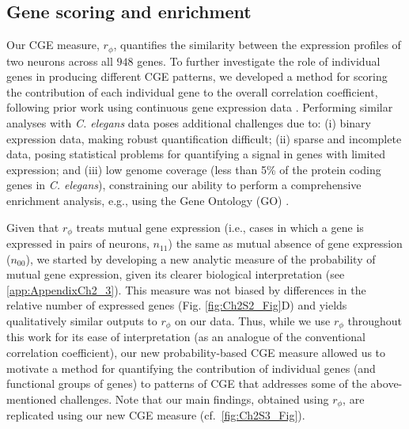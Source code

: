 \subsection*{Gene scoring and enrichment}
Our CGE measure, $r_\phi$, quantifies the similarity between the expression profiles of two neurons across all $948$ genes.
To further investigate the role of individual genes in producing different CGE patterns, we developed a method for scoring the contribution of each individual gene to the overall correlation coefficient, following prior work using continuous gene expression data \citep{Fulcher2016}.
Performing similar analyses with \emph{C. elegans} data poses additional challenges due to:
(i) binary expression data, making robust quantification difficult;
(ii) sparse and incomplete data, posing statistical problems for quantifying a signal in genes with limited expression;
and (iii) low genome coverage (less than 5\% of the protein coding genes in \emph{C. elegans}), constraining our ability to perform a comprehensive enrichment analysis, e.g., using the Gene Ontology (GO) \citep{Ashburner2000}.

Given that $r_\phi$ treats mutual gene expression (i.e., cases in which a gene is expressed in pairs of neurons, $n_{11}$) the same as mutual absence of gene expression ($n_{00}$), we started by developing a new analytic measure of the probability of mutual gene expression, given its clearer biological interpretation (see \ref{app:AppendixCh2_3}).
This measure was not biased by differences in the relative number of expressed genes (Fig. \ref{fig:Ch2S2_Fig}D) and yields qualitatively similar outputs to $r_\phi$ on our data.
Thus, while we use $r_\phi$ throughout this work for its ease of interpretation (as an analogue of the conventional correlation coefficient), our new probability-based CGE measure allowed us to motivate a method for quantifying the contribution of individual genes (and functional groups of genes) to patterns of CGE that addresses some of the above-mentioned challenges.
Note that our main findings, obtained using $r_\phi$, are replicated using our new CGE measure (cf.~\ref{fig:Ch2S3_Fig}).

